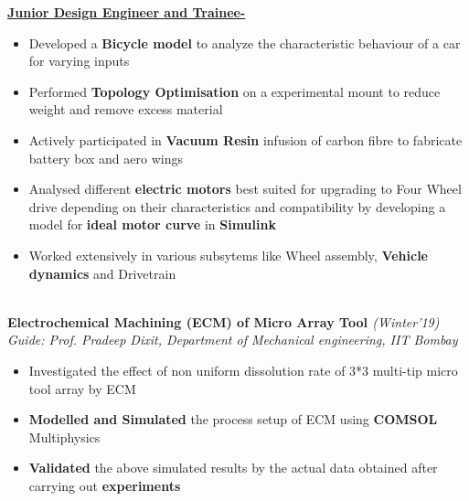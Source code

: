 \documentclass{article}
\begin{document}
 \textbf{\underline{Junior Design Engineer and Trainee-}}
\begin{itemize}[itemsep = -0.75 mm, leftmargin=*]
\vspace{-3pt}
\item Developed a \textbf{Bicycle model} to analyze the characteristic behaviour of a car for varying inputs
\item Performed \textbf{Topology Optimisation} on a experimental mount to reduce weight and remove excess material
\item Actively participated in \textbf{Vacuum Resin} infusion of carbon fibre to fabricate battery box and aero wings
\item Analysed different \textbf{electric motors} best suited for upgrading to Four Wheel drive depending on their characteristics and compatibility by developing a model for \textbf{ideal motor curve} in \textbf{Simulink}
\item Worked extensively in various subsytems like Wheel assembly, \textbf{Vehicle dynamics} and Drivetrain
\end{itemize} \\
\textbf{\large{Electrochemical Machining (ECM) of Micro Array Tool }}\hfill{\sl \small (Winter'19)}
\vspace{-3pt} 
{\sl\small Guide: Prof. Pradeep Dixit, Department of Mechanical engineering, IIT Bombay}
\vspace{-6pt}
\begin{itemize}[itemsep = -0.75 mm, leftmargin=*]
\item Investigated the effect of non uniform dissolution rate of 3*3 multi-tip micro tool array by ECM
\item \textbf{Modelled and Simulated} the process setup of ECM using \textbf{COMSOL} Multiphysics
\item \textbf{Validated} the above simulated results by the actual data obtained after carrying out \textbf{experiments}
\end{itemize}
\end{document}

